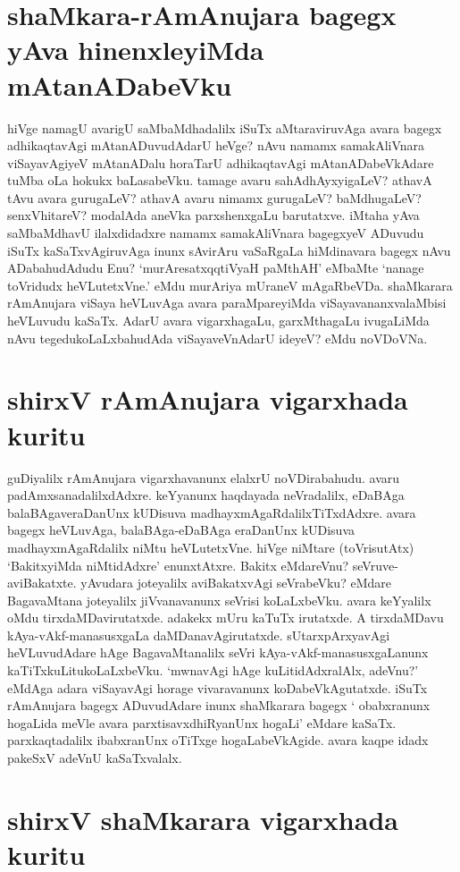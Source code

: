 \section*{shaMkara-rAmAnujara bagegx  yAva hinenxleyiMda mAtanADabeVku}

hiVge namagU avarigU saMbaMdhadalilx iSuTx aMtaraviruvAga avara bagegx adhikaqtavAgi mAtanADuvudAdarU heVge? nAvu namamx samakAliVnara viSayavAgiyeV mAtanADalu horaTarU adhikaqtavAgi mAtanADabeVkAdare tuMba oLa hokukx baLasabeVku. tamage avaru sahAdhAyxyigaLeV? athavA tAvu avara gurugaLeV? athavA avaru nimamx gurugaLeV? baMdhugaLeV? senxVhitareV? modalAda aneVka  parxshenxgaLu barutatxve. iMtaha yAva saMbaMdhavU ilalxdidadxre namamx samakAliVnara bagegxyeV ADuvudu iSuTx  kaSaTxvAgiruvAga inunx sAvirAru vaSaRgaLa hiMdinavara bagegx nAvu ADabahudAdudu Enu? `murAresatxqqtiVyaH paMthAH'\label{43} eMbaMte `nanage toVridudx heVLutetxVne.' eMdu murAriya mUraneV mAgaRbeVDa. shaMkarara rAmAnujara viSaya heVLuvAga avara paraMpareyiMda viSayavananxvalaMbisi heVLuvudu kaSaTx. AdarU avara vigarxhagaLu, garxMthagaLu ivugaLiMda nAvu tegedukoLaLxbahudAda viSayaveVnAdarU ideyeV? eMdu noVDoVNa.

\section*{shirxV rAmAnujara vigarxhada kuritu}

guDiyalilx rAmAnujara vigarxhavanunx elalxrU noVDirabahudu. avaru padAmxsanadalilxdAdxre. keYyanunx haqdayada neVradalilx, eDaBAga balaBAgaveraDanUnx kUDisuva madhayxmAgaRdalilxTiTxdAdxre. avara bagegx heVLuvAga, balaBAga-eDaBAga eraDanUnx kUDisuva madhayxmAgaRdalilx niMtu heVLutetxVne. hiVge niMtare (toVrisutAtx) `BakitxyiMda niMtidAdxre' enunxtAtxre. Bakitx eMdareVnu? seVruve-aviBakatxte. yAvudara joteyalilx aviBakatxvAgi seVrabeVku? eMdare BagavaMtana joteyalilx jiVvanavanunx seVrisi koLaLxbeVku. avara keYyalilx oMdu tirxdaMDavirutatxde. adakekx mUru kaTuTx irutatxde. A tirxdaMDavu kAya-vAkf-manasusxgaLa daMDanavAgirutatxde. sUtarxpArxyavAgi heVLuvudAdare hAge BagavaMtanalilx seVri kAya-vAkf-manasusxgaLanunx kaTiTxkuLitukoLaLxbeVku. `mwnavAgi hAge kuLitidAdxralAlx, adeVnu?' eMdAga adara viSayavAgi horage vivaravanunx koDabeVkAgutatxde. iSuTx rAmAnujara bagegx ADuvudAdare inunx shaMkarara bagegx ` obabxranunx hogaLida meVle avara parxtisavxdhiRyanUnx hogaLi' eMdare kaSaTx. parxkaqtadalilx ibabxranUnx oTiTxge hogaLabeVkAgide. avara kaqpe idadx pakeSxV adeVnU kaSaTxvalalx.

\section*{shirxV shaMkarara vigarxhada kuritu}

